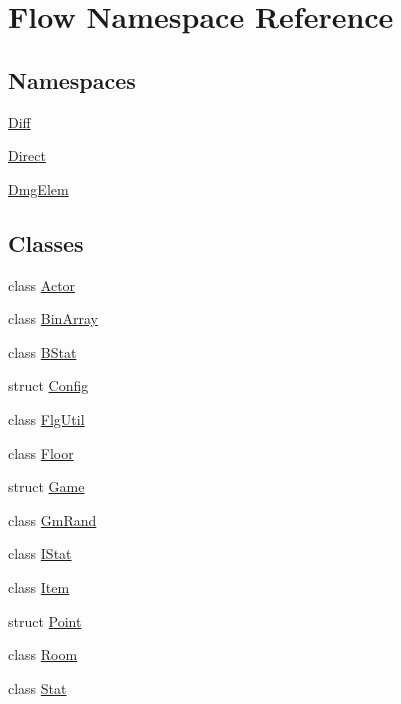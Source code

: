 \hypertarget{namespace_flow}{}\section{Flow Namespace Reference}
\label{namespace_flow}
\subsection*{Namespaces}
\begin{DoxyCompactItemize}
\item 
 \hyperlink{namespace_flow_1_1_diff}{Diff}
\item 
 \hyperlink{namespace_flow_1_1_direct}{Direct}
\item 
 \hyperlink{namespace_flow_1_1_dmg_elem}{Dmg\+Elem}
\end{DoxyCompactItemize}
\subsection*{Classes}
\begin{DoxyCompactItemize}
\item 
class \hyperlink{class_flow_1_1_actor}{Actor}
\item 
class \hyperlink{class_flow_1_1_bin_array}{Bin\+Array}
\item 
class \hyperlink{class_flow_1_1_b_stat}{B\+Stat}
\item 
struct \hyperlink{struct_flow_1_1_config}{Config}
\item 
class \hyperlink{class_flow_1_1_flg_util}{Flg\+Util}
\item 
class \hyperlink{class_flow_1_1_floor}{Floor}
\item 
struct \hyperlink{struct_flow_1_1_game}{Game}
\item 
class \hyperlink{class_flow_1_1_gm_rand}{Gm\+Rand}
\item 
class \hyperlink{class_flow_1_1_i_stat}{I\+Stat}
\item 
class \hyperlink{class_flow_1_1_item}{Item}
\item 
struct \hyperlink{struct_flow_1_1_point}{Point}
\item 
class \hyperlink{class_flow_1_1_room}{Room}
\item 
class \hyperlink{class_flow_1_1_stat}{Stat}
\end{DoxyCompactItemize}
